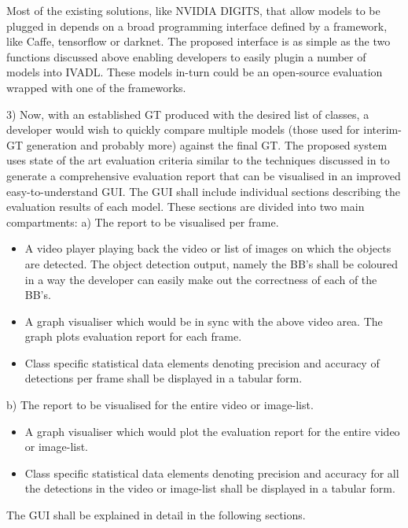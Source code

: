 \documentclass[conference]{IEEEtran}
\begin{document}
Most of the existing solutions, like NVIDIA DIGITS, that allow models to be plugged in depends on a broad programming interface defined by a framework, like Caffe, tensorflow or darknet. The proposed interface is as simple as the two functions discussed above enabling developers to easily plugin a number of models into IVADL. These models in-turn could be an open-source evaluation wrapped with one of the frameworks. 

3) Now, with an established GT produced with the desired list of classes, a developer would wish to quickly compare multiple models (those used for interim-GT generation and probably more) against the final GT. The proposed system uses state of the art evaluation criteria similar to the techniques discussed in \cite{everingham2010vocchallenge} to generate a comprehensive evaluation report that can be visualised in an improved easy-to-understand GUI.
The GUI shall include individual sections describing the evaluation results of each model. These sections are divided into two main compartments:
a) The report to be visualised per frame.
\begin{itemize}
	\item A video player playing back the video or list of images on which the objects are detected. The object detection output, namely the BB's shall be coloured in a way the developer can easily make out the correctness of each of the BB's.
	\item A graph visualiser which would be in sync with the above video area. The graph plots evaluation report for each frame.
	\item Class specific statistical data elements denoting precision and accuracy of detections per frame shall be displayed in a tabular form.
\end{itemize}
b) The report to be visualised for the entire video or image-list.
\begin{itemize}
	\item A graph visualiser which would plot the evaluation report for the entire video or image-list.
	\item Class specific statistical data elements denoting precision and accuracy for all the detections in the video or image-list shall be displayed in a tabular form.
\end{itemize}
The GUI shall be explained in detail in the following sections.
\end{document}
